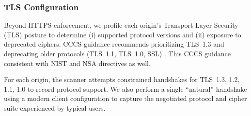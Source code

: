 \documentclass[conference]{IEEEtran}
\begin{document}


\subsubsection{TLS Configuration}
Beyond HTTPS enforcement, we profile each origin's Transport Layer Security (TLS) posture to determine (i) supported
 protocol versions and (ii) exposure to deprecated ciphers. CCCS guidance recommends prioritizing TLS~1.3 and 
 deprecating older protocols (TLS~1.1, TLS~1.0, SSL) \cite{cccs-itsap-40016,cccs-itsp-40062}. This CCCS guidance
  consistent with NIST and NSA directives \cite{nist_800_52r2,nsa_eliminating_obsolete_tls} as well. 

For each origin, the scanner attempts constrained handshakes for TLS~1.3, 1.2, 1.1, 1.0
to record protocol support. We also perform a single ``natural'' handshake using a modern 
client configuration to capture the negotiated protocol and cipher suite experienced by typical users.

\end{document}
